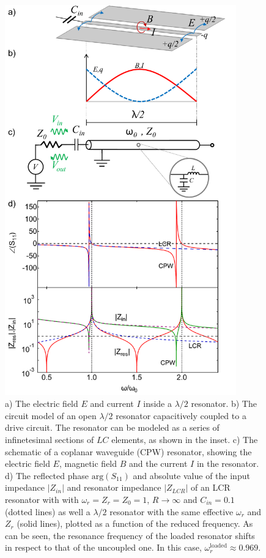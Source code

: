 \begin{figure}
	\includegraphics[width=10cm]{"./material/mathematica/lcr_and_cpw_schematic_with_plots"}
	\caption{a) The electric field $E$ and current $I$ inside a $\lambda/2$ resonator. b) The circuit model of an open $\lambda/2$ resonator capacitively coupled to a drive circuit. The resonator can be modeled as a series of infinetesimal sections of $LC$ elements, as shown in the inset. c) The schematic of a coplanar waveguide (CPW) resonator, showing the electric field $E$, magnetic field $B$ and the current $I$ in the resonator. d) The reflected phase $\mathrm{arg}(S_{11})$ and absolute value of the input impedance $|Z_{in}|$ and resonator impedance $|Z_{LCR}|$ of an LCR resonator with with $\omega_r=Z_r=Z_0=1$, $R\to\infty$ and $C_{in}=0.1$ (dotted lines) as well a $\lambda/2$ resonator with the same effective $\omega_r$ and $Z_r$ (solid lines), plotted as a function of the reduced frequency. As can be seen, the resonance frequency of the loaded resonator shifts in respect to that of the uncoupled one. In this case, $\omega_{r}^\mathrm{loaded}\approx 0.969$.}
	\label{fig:lambda_over_2_response}
\end{figure}

